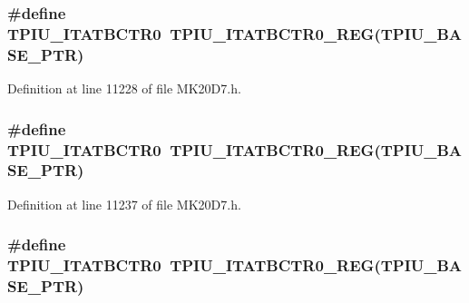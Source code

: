 \subsubsection[{\texorpdfstring{T\+P\+I\+U\+\_\+\+I\+T\+A\+T\+B\+C\+T\+R0}{TPIU_ITATBCTR0}}]{\setlength{\rightskip}{0pt plus 5cm}\#define T\+P\+I\+U\+\_\+\+I\+T\+A\+T\+B\+C\+T\+R0~{\bf T\+P\+I\+U\+\_\+\+I\+T\+A\+T\+B\+C\+T\+R0\+\_\+\+R\+EG}({\bf T\+P\+I\+U\+\_\+\+B\+A\+S\+E\+\_\+\+P\+TR})}\hypertarget{group___t_p_i_u___register___accessor___macros_gad4d36b3e743687bc954cf918a8f0a669}{}\label{group___t_p_i_u___register___accessor___macros_gad4d36b3e743687bc954cf918a8f0a669}


Definition at line 11228 of file M\+K20\+D7.\+h.

\subsubsection[{\texorpdfstring{T\+P\+I\+U\+\_\+\+I\+T\+A\+T\+B\+C\+T\+R0}{TPIU_ITATBCTR0}}]{\setlength{\rightskip}{0pt plus 5cm}\#define T\+P\+I\+U\+\_\+\+I\+T\+A\+T\+B\+C\+T\+R0~{\bf T\+P\+I\+U\+\_\+\+I\+T\+A\+T\+B\+C\+T\+R0\+\_\+\+R\+EG}({\bf T\+P\+I\+U\+\_\+\+B\+A\+S\+E\+\_\+\+P\+TR})}\hypertarget{group___t_p_i_u___register___accessor___macros_gad4d36b3e743687bc954cf918a8f0a669}{}\label{group___t_p_i_u___register___accessor___macros_gad4d36b3e743687bc954cf918a8f0a669}


Definition at line 11237 of file M\+K20\+D7.\+h.

\subsubsection[{\texorpdfstring{T\+P\+I\+U\+\_\+\+I\+T\+A\+T\+B\+C\+T\+R0}{TPIU_ITATBCTR0}}]{\setlength{\rightskip}{0pt plus 5cm}\#define T\+P\+I\+U\+\_\+\+I\+T\+A\+T\+B\+C\+T\+R0~{\bf T\+P\+I\+U\+\_\+\+I\+T\+A\+T\+B\+C\+T\+R0\+\_\+\+R\+EG}({\bf T\+P\+I\+U\+\_\+\+B\+A\+S\+E\+\_\+\+P\+TR})}\hypertarget{group___t_p_i_u___register___accessor___macros_gad4d36b3e743687bc954cf918a8f0a669}{}\label{group___t_p_i_u___register___accessor___macros_gad4d36b3e743687bc954cf918a8f0a669}


